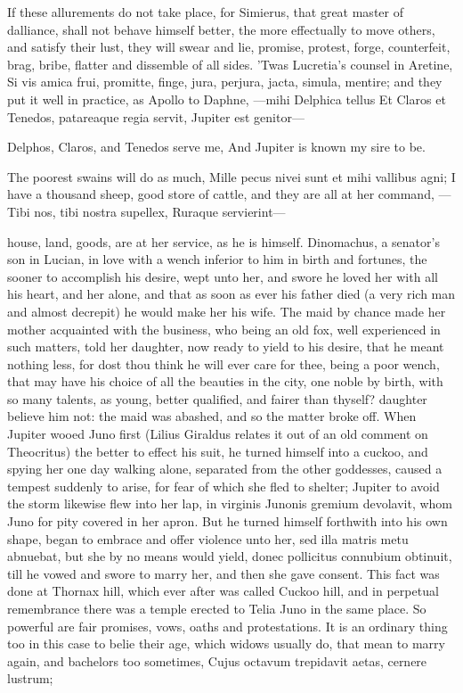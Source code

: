 {If these allurements do not take place, for Simierus, that great
master of dalliance, shall not behave himself better, the more
effectually to move others, and satisfy their lust, they will swear and
lie, promise, protest, forge, counterfeit, brag, bribe, flatter and
dissemble of all sides. 'Twas Lucretia's counsel in Aretine, Si vis
amica frui, promitte, finge, jura, perjura, jacta, simula, mentire; and
they put it well in practice, as Apollo to Daphne,
---mihi Delphica tellus
Et Claros et Tenedos, patareaque regia servit,
Jupiter est genitor---

Delphos, Claros, and Tenedos serve me,
And Jupiter is known my sire to be.

The poorest swains will do as much, Mille pecus nivei sunt
et mihi vallibus agni; I have a thousand sheep, good store of cattle,
and they are all at her command,
---Tibi nos, tibi nostra supellex,
Ruraque servierint---

house, land, goods, are at her service, as he is himself. Dinomachus, a
senator's son in Lucian, in love with a wench inferior to him in
birth and fortunes, the sooner to accomplish his desire, wept unto her,
and swore he loved her with all his heart, and her alone, and that as
soon as ever his father died (a very rich man and almost decrepit) he
would make her his wife. The maid by chance made her mother acquainted
with the business, who being an old fox, well experienced in such
matters, told her daughter, now ready to yield to his desire, that he
meant nothing less, for dost thou think he will ever care for thee,
being a poor wench, that may have his choice of all the beauties
in the city, one noble by birth, with so many talents, as young, better
qualified, and fairer than thyself? daughter believe him not: the maid
was abashed, and so the matter broke off. When Jupiter wooed Juno first
(Lilius Giraldus relates it out of an old comment on Theocritus) the
better to effect his suit, he turned himself into a cuckoo, and spying
her one day walking alone, separated from the other goddesses, caused a
tempest suddenly to arise, for fear of which she fled to shelter;
Jupiter to avoid the storm likewise flew into her lap, in virginis
Junonis gremium devolavit, whom Juno for pity covered in her
apron. But he turned himself forthwith into his own shape, began
to embrace and offer violence unto her, sed illa matris metu abnuebat,
but she by no means would yield, donec pollicitus connubium obtinuit,
till he vowed and swore to marry her, and then she gave consent. This
fact was done at Thornax hill, which ever after was called Cuckoo hill,
and in perpetual remembrance there was a temple erected to Telia Juno
in the same place. So powerful are fair promises, vows, oaths and
protestations. It is an ordinary thing too in this case to belie their
age, which widows usually do, that mean to marry again, and bachelors
too sometimes,
Cujus octavum trepidavit aetas,
cernere lustrum;

}
